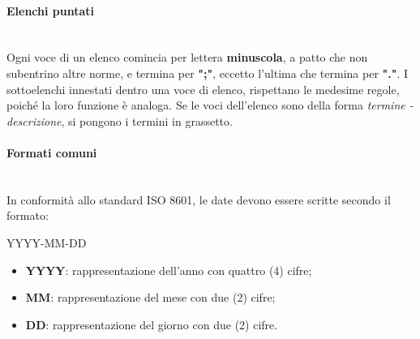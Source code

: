 		\paragraph{Elenchi puntati} \mbox{}\\
		Ogni voce di un elenco comincia per lettera \textbf{minuscola}, a patto che non subentrino altre norme, e termina per \textbf{";"}, eccetto l'ultima che termina per \textbf{"."}. I sottoelenchi innestati dentro una voce di elenco, rispettano le medesime regole, poiché la loro funzione è analoga.\newline
		Se le voci dell'elenco sono della forma \textit{termine - descrizione}, si pongono i termini in grassetto.
		\paragraph{Formati comuni} \mbox{}\\
		In conformità allo standard ISO 8601, le date devono essere scritte secondo il formato: \newline
		\centerline{YYYY-MM-DD}
		\begin{itemize}
			\item \textbf{YYYY}: rappresentazione dell'anno con quattro (4) cifre;
			\item\textbf{MM}: rappresentazione del mese con due (2) cifre;
			\item \textbf{DD}: rappresentazione del giorno con due (2) cifre.			
		\end{itemize}
